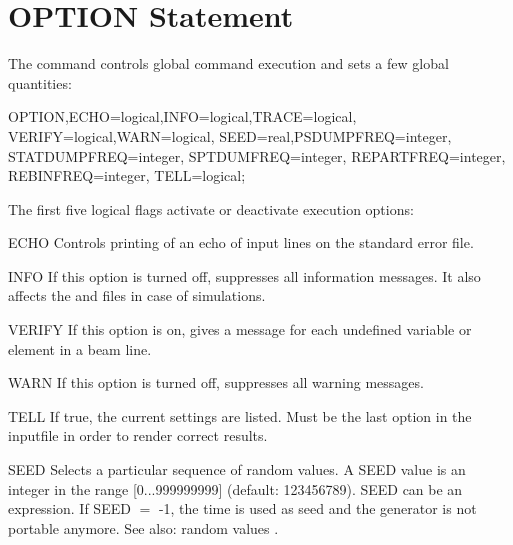 \section{OPTION Statement}
\label{sec:option}
The  command controls global command execution and sets
a few global quantities:
\begin{example}
OPTION,ECHO=logical,INFO=logical,TRACE=logical,
       VERIFY=logical,WARN=logical,
       SEED=real,PSDUMPFREQ=integer,
       STATDUMPFREQ=integer, SPTDUMFREQ=integer,
       REPARTFREQ=integer, REBINFREQ=integer, TELL=logical;
\end{example}
The first five logical flags activate or deactivate execution options:
\begin{kdescription}
  \item[ECHO]
  Controls printing of an echo of input lines on the standard error file.

  \item[INFO]
  If this option is turned off, \opal suppresses all information messages. It also affects the  and   files in case of \opalcycl simulations.

  \item[VERIFY]
  If this option is on, \opal gives a message for each undefined variable
  or element in a beam line.

  \item[WARN]
  If this option is turned off, \opal suppresses all warning messages.

  \item[TELL]
  If true, the current settings are listed. Must be the last option in the inputfile in order to render correct results.

  \item[SEED]
  Selects a particular sequence of random values.
  A SEED value is an integer in the range [0...999999999] (default: 123456789).
  SEED can be an expression. If SEED $=$ -1, the time is used as seed and the generator is not portable anymore.
  See also: random values .


\end{kdescription}
